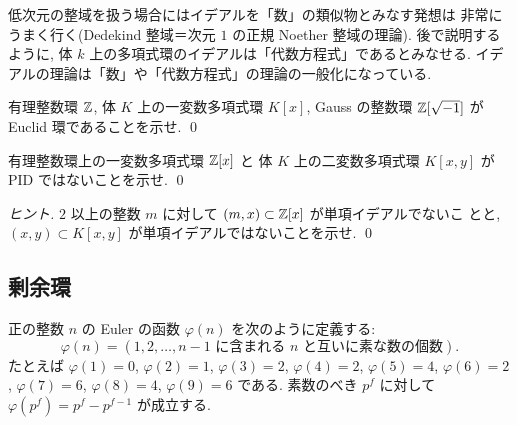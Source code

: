 \documentclass[12pt,twoside]{jarticle}
\begin{document}
低次元の整域を扱う場合にはイデアルを「数」の類似物とみなす発想は
非常にうまく行く(Dedekind 整域＝次元 $1$ の正規 Noether 整域の理論).
後で説明するように, 
体 $k$ 上の多項式環のイデアルは「代数方程式」であるとみなせる.
イデアルの理論は「数」や「代数方程式」の理論の一般化になっている.

\begin{question}
 有理整数環 ${\mathbb Z}$, 体 $K$ 上の一変数多項式環 $K[x]$, 
 Gauss の整数環 ${\mathbb Z}[\sqrt{-1}]$ が Euclid 環であることを示せ.
 \qed
\end{question}

\begin{question}
 有理整数環上の一変数多項式環 ${\mathbb Z}[x]$ と
 体 $K$ 上の二変数多項式環 $K[x,y]$ が PID ではないことを示せ.
 \qed
\end{question}

\begin{proof}[ヒント]
 $2$ 以上の整数 $m$ に対して $(m,x)\subset{\mathbb Z}[x]$ が単項イデアルでないこ
 とと, $(x,y)\subset K[x,y]$ が単項イデアルではないことを示せ. \qed
\end{proof}


\subsection{剰余環}

正の整数 $n$ の Euler の函数 $\varphi(n)$ を次のように定義する:
\begin{equation*}
 \varphi(n) = 
 (\text{$1,2,\ldots,n-1$ に含まれる $n$ と互いに素な数の個数}).
\end{equation*}
たとえば $\varphi(1)=0$, $\varphi(2)=1$, $\varphi(3)=2$, $\varphi(4)=2$,
$\varphi(5)=4$, $\varphi(6)=2$, $\varphi(7)=6$, $\varphi(8)=4$,
$\varphi(9)=6$ である.
素数のべき $p^f$ に対して $\varphi(p^f)=p^f-p^{f-1}$ が成立する.
\end{document}
